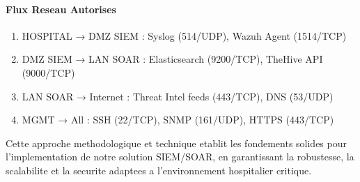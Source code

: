 \paragraph{Flux Reseau Autorises}
\begin{enumerate}
    \item HOSPITAL → DMZ SIEM : Syslog (514/UDP), Wazuh Agent (1514/TCP)
    \item DMZ SIEM → LAN SOAR : Elasticsearch (9200/TCP), TheHive API (9000/TCP)
    \item LAN SOAR → Internet : Threat Intel feeds (443/TCP), DNS (53/UDP)
    \item MGMT → All : SSH (22/TCP), SNMP (161/UDP), HTTPS (443/TCP)
\end{enumerate}

Cette approche methodologique et technique etablit les fondements solides pour l'implementation de notre solution SIEM/SOAR, en garantissant la robustesse, la scalabilite et la securite adaptees a l'environnement hospitalier critique.
